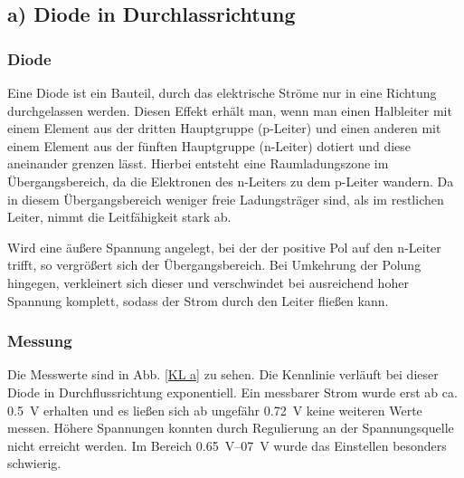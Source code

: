 \documentclass[11pt,a4paper,titlepage, ngerman]{article}
\begin{document}
		\subsection{a) Diode in Durchlassrichtung} 
			\label{a)}
			
			\subsubsection*{Diode}
				\label{Diode}
								
				Eine Diode ist ein Bauteil, durch das elektrische Ströme nur in eine Richtung durchgelassen werden.
				Diesen Effekt erhält man, wenn man einen Halbleiter mit einem Element aus der dritten Hauptgruppe (p-Leiter) und einen anderen mit einem Element aus der fünften Hauptgruppe (n-Leiter) dotiert und diese aneinander grenzen lässt.
				Hierbei entsteht eine Raumladungszone im Übergangsbereich, da die Elektronen des n-Leiters zu dem p-Leiter wandern.
				Da in diesem Übergangsbereich weniger freie Ladungsträger sind, als im restlichen Leiter, nimmt die Leitfähigkeit stark ab.
				
				Wird eine äußere Spannung angelegt, bei der der positive Pol auf den n-Leiter trifft, so vergrößert sich der Übergangsbereich.
				Bei Umkehrung der Polung hingegen, verkleinert sich dieser und verschwindet bei ausreichend hoher Spannung komplett, sodass der Strom durch den Leiter fließen kann. 
			
			\subsubsection*{Messung}
				
				Die Messwerte sind in Abb. \ref{KL a} zu sehen. Die Kennlinie verläuft bei dieser Diode in Durchflussrichtung exponentiell.
				Ein messbarer Strom wurde erst ab ca. \SI{0.5}{\V} erhalten und es ließen sich ab ungefähr \SI{0.72}{\V} keine weiteren Werte messen. Höhere Spannungen konnten durch Regulierung an der Spannungsquelle nicht erreicht werden. Im Bereich \SIrange{0,65}{07}{\V} wurde das Einstellen besonders schwierig.
				
\end{document}
